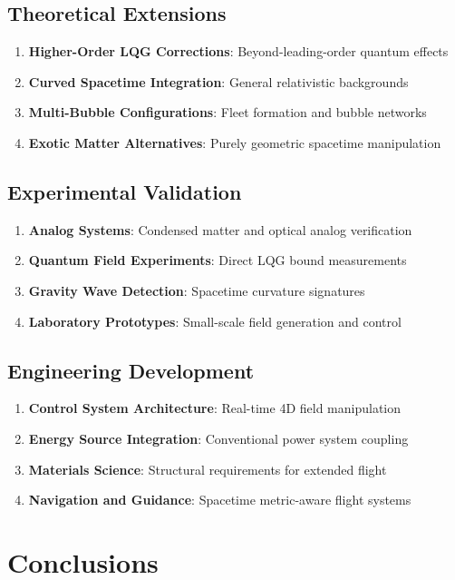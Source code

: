 \documentclass[12pt,a4paper]{article}
\begin{document}
\subsection{Theoretical Extensions}

\begin{enumerate}
\item \textbf{Higher-Order LQG Corrections}: Beyond-leading-order quantum effects
\item \textbf{Curved Spacetime Integration}: General relativistic backgrounds
\item \textbf{Multi-Bubble Configurations}: Fleet formation and bubble networks
\item \textbf{Exotic Matter Alternatives}: Purely geometric spacetime manipulation
\end{enumerate}

\subsection{Experimental Validation}

\begin{enumerate}
\item \textbf{Analog Systems}: Condensed matter and optical analog verification
\item \textbf{Quantum Field Experiments}: Direct LQG bound measurements
\item \textbf{Gravity Wave Detection}: Spacetime curvature signatures
\item \textbf{Laboratory Prototypes}: Small-scale field generation and control
\end{enumerate}

\subsection{Engineering Development}

\begin{enumerate}
\item \textbf{Control System Architecture}: Real-time 4D field manipulation
\item \textbf{Energy Source Integration}: Conventional power system coupling
\item \textbf{Materials Science}: Structural requirements for extended flight
\item \textbf{Navigation and Guidance}: Spacetime metric-aware flight systems
\end{enumerate}

\section{Conclusions}
\end{document}
